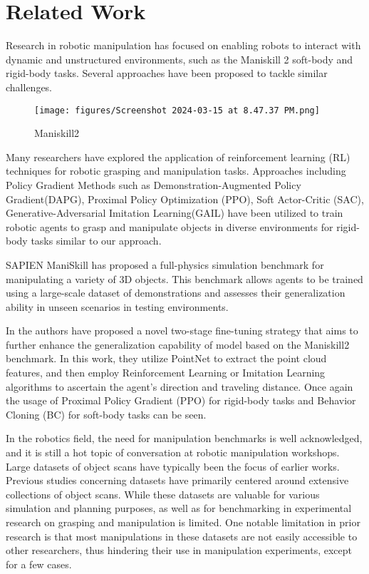 \documentclass[../report.tex]{subfiles}
\begin{document}
    \section{Related Work}
    \label{sec:related_work}

    Research in robotic manipulation has focused on enabling robots to interact with dynamic and unstructured environments, such as the Maniskill 2 soft-body and rigid-body tasks. Several approaches have been proposed to tackle similar challenges.
    
    \begin{figure}
        \texttt{[image: figures/Screenshot 2024-03-15 at 8.47.37 PM.png]}
        \caption{Maniskill2}
        \label{fig:maniskill2}
    \end{figure}


    Many researchers have explored the application of reinforcement learning (RL) techniques for robotic grasping and manipulation tasks. Approaches including Policy Gradient Methods such as Demonstration-Augmented Policy Gradient(DAPG), Proximal Policy Optimization (PPO), Soft Actor-Critic (SAC), Generative-Adversarial Imitation Learning(GAIL)  have been utilized to train robotic agents to grasp and manipulate objects in diverse environments for rigid-body tasks similar to our approach.
    
    SAPIEN ManiSkill \cite{ManiSkillChallenge} has proposed a full-physics simulation benchmark for manipulating a variety of 3D objects. This benchmark allows agents to be trained using a large-scale dataset of demonstrations and assesses their generalization ability in unseen scenarios in testing environments. 
    
    In \cite{gao2023two} the authors have proposed a novel two-stage fine-tuning strategy that aims to further enhance the generalization capability of model based on the Maniskill2 benchmark. In this work, they utilize PointNet to extract the point cloud features, and then employ Reinforcement Learning or Imitation Learning algorithms \cite{xu2014reinforcement} to ascertain the agent's direction and traveling distance. Once again the usage of Proximal Policy Gradient (PPO) \cite{schulman2017proximal} for rigid-body tasks and Behavior Cloning (BC) \cite{torabi2018behavioral} for soft-body tasks can be seen. 
    
    In the robotics field, the need for manipulation benchmarks is well acknowledged, and it is still a hot topic of conversation at robotic manipulation workshops. Large datasets of object scans have typically been the focus of earlier works. 
    Previous studies concerning  datasets have primarily centered around extensive collections of object scans. While these datasets are valuable for various simulation and planning purposes, as well as for benchmarking in experimental research on grasping and manipulation is limited. One notable limitation in prior research is that most manipulations in these datasets are not easily accessible to other researchers, thus hindering their use in manipulation experiments, except for a few cases.
    
\end{document}
